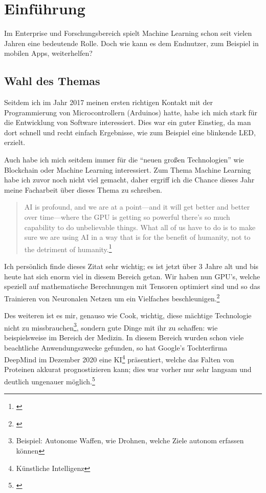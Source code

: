 \section{Einführung}
Im Enterprise und Forschungsbereich spielt Machine Learning schon seit vielen Jahren eine bedeutende Rolle. Doch wie kann es dem Endnutzer, zum Beispiel in mobilen Apps, weiterhelfen?

\subsection{Wahl des Themas}

Seitdem ich im Jahr 2017 meinen ersten richtigen Kontakt mit der Programmierung von Microcontrollern (Arduinos) hatte, habe ich mich stark für die Entwicklung von Software interessiert. Dies war ein guter Einstieg, da man dort schnell und recht einfach Ergebnisse, wie zum Beispiel eine blinkende LED, erzielt.

Auch habe ich mich seitdem immer für die "`neuen großen Technologien"' wie Blockchain oder Machine Learning interessiert. Zum Thema Machine Learning habe ich zuvor noch nicht viel gemacht, daher ergriff ich die Chance dieses Jahr meine Facharbeit über dieses Thema zu schreiben.


\begin{quotation}
    AI is profound, and we are at a point—and it will get better and better over time—where the GPU is getting so powerful there’s so much capability to do unbelievable things. What all of us have to do is to make sure we are using AI in a way that is for the benefit of humanity, not to the detriment of humanity.\footnote{\cite[Tim Cook (CEO von Apple) In einem Interview mit MIT Technology Review]{timcookquote}}
\end{quotation}

Ich persönlich finde dieses Zitat sehr wichtig; es ist jetzt über 3 Jahre alt und bis heute hat sich enorm viel in diesem Bereich getan. Wir haben nun GPU's, welche speziell auf mathematische Berechnungen mit Tensoren optimiert sind und so das Trainieren von Neuronalen Netzen um ein Vielfaches beschleunigen.\footnote{\cite[NVIDIA Grafikprozessoren mit integrierten Tensor Kernen]{nvidiatensorcores}}

Des weiteren ist es mir, genauso wie Cook, wichtig, diese mächtige Technologie nicht zu missbrauchen\footnote{Beispiel: Autonome Waffen, wie Drohnen, welche Ziele autonom erfassen können}, sondern gute Dinge mit ihr zu schaffen: wie beispielsweise im Bereich der Medizin. In diesem Bereich wurden schon viele beachtliche Anwendungszwecke gefunden, so hat Google's Tochterfirma DeepMind im Dezember 2020 eine KI\footnote{Künstliche Intelligenz} präsentiert, welche das Falten von Proteinen akkurat prognostizieren kann; dies war vorher nur sehr langsam und deutlich ungenauer möglich.\footnote{\cite{deepmindprotein}}

